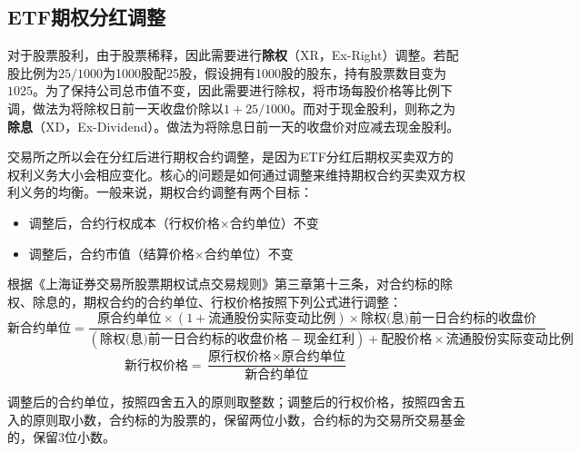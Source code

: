 \documentclass[11pt]{article}
\begin{document}
\subsection{ETF期权分红调整}

对于股票股利，由于股票稀释，因此需要进行\textbf{除权}（XR，Ex-Right）调整。若配股比例为$25/1000$为1000股配25股，假设拥有1000股的股东，持有股票数目变为$1025$。为了保持公司总市值不变，因此需要进行除权，将市场每股价格等比例下调，做法为将除权日前一天收盘价除以$1+25/1000$。而对于现金股利，则称之为\textbf{除息}（XD，Ex-Dividend）。做法为将除息日前一天的收盘价对应减去现金股利。

交易所之所以会在分红后进行期权合约调整，是因为ETF分红后期权买卖双方的权利义务大小会相应变化。核心的问题是如何通过调整来维持期权合约买卖双方权利义务的均衡。一般来说，期权合约调整有两个目标：
\begin{itemize}
    \item 调整后，合约行权成本（行权价格$\times$合约单位）不变
    \item 调整后，合约市值（结算价格$\times$合约单位）不变
\end{itemize}

\divider

根据《上海证券交易所股票期权试点交易规则》第三章第十三条，对合约标的除权、除息的，期权合约的合约单位、行权价格按照下列公式进行调整：
\small
\begin{equation*}
    \textbf{新合约单位} = \frac{\text{原合约单位}\times\left(1+\text{流通股份实际变动比例}\right)\times\text{除权(息)前一日合约标的收盘价}}{\left(\text{除权(息)前一日合约标的收盘价格}-\text{现金红利}\right)+\text{配股价格}\times\text{流通股份实际变动比例}}
\end{equation*}
\begin{equation*}
    \textbf{新行权价格} = \frac{\text{原行权价格}\times\text{原合约单位}}{\text{新合约单位}}
\end{equation*}
\normalsize

调整后的合约单位，按照四舍五入的原则取整数；调整后的行权价格，按照四舍五入的原则取小数，合约标的为股票的，保留两位小数，合约标的为交易所交易基金的，保留3位小数。

\divider
\end{document}

